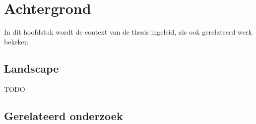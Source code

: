 \chapter{Achtergrond}
\label{achtergrond}

In dit hoofdstuk wordt de context van de thesis ingeleid, als ook gerelateerd werk bekeken.

\section{Landscape}

TODO

\section{Gerelateerd onderzoek}

\cite{ganeriwal2008reputation,krontiris2009cooperative,castelluccia2009difficulty,krauss2007detecting,seshadri2008sake,maerien2012famos,aschenbruck2012security,afzal2012difisec,yue2012novel,kuang2010snds,blilat2012wireless,ramesh2012wireless,valero2012di,perrig2004security,zhang2000intrusion,djenouri2005survey,yu2008framework,rassam2011novel,da2005decentralized,kachirski2003effective,li2008group,mishra2004intrusion,krontiris2008lidea,ioannis2007towards,soliman2012comparative,wang2011integrated,zhijie2012intrusion}

